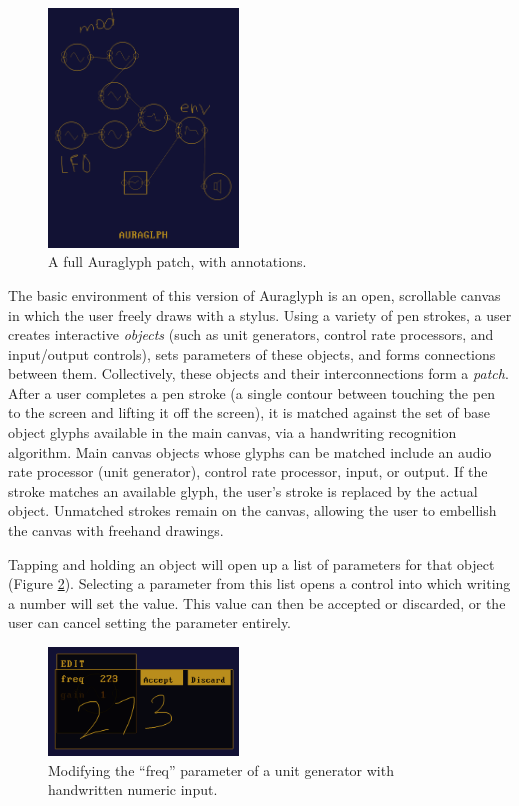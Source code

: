 \documentclass[10pt,letterpaper]{article}
\begin{document}
\begin{figure}[h]
	\centering
		\includegraphics[width=0.45\textwidth]{figures/patch.png}
	\caption{A full Auraglyph patch, with annotations.}
	\label{fig:patch}
\end{figure}

The basic environment of this version of Auraglyph is an open, scrollable canvas in which the user freely draws with a stylus. 
Using a variety of pen strokes, a user creates interactive \emph{objects} (such as unit generators, control rate processors, and input/output controls), sets parameters of these objects, and forms connections between them. 
Collectively, these objects and their interconnections form a \emph{patch}. 
After a user completes a pen stroke (a single contour between touching the pen to the screen and lifting it off the screen), it is matched against the set of base object glyphs available in the main canvas, via a handwriting recognition algorithm. 
Main canvas objects whose glyphs can be matched include an audio rate processor (unit generator), control rate processor, input, or output. 
If the stroke matches an available glyph, the user's stroke is replaced by the actual object. 
Unmatched strokes remain on the canvas, allowing the user to embellish the canvas with freehand drawings. 

Tapping and holding an object will open up a list of parameters for that object (Figure \ref{fig:editor}). 
Selecting a parameter from this list opens a control into which writing a number will set the value. 
This value can then be accepted or discarded, or the user can cancel setting the parameter entirely. 

\begin{figure}[h]
	\centering
		\includegraphics[width=0.45\textwidth]{figures/editor.png}
	\caption{Modifying the ``freq'' parameter of a unit generator with handwritten numeric input.}
	\label{fig:editor}
\end{figure}
\end{document}
